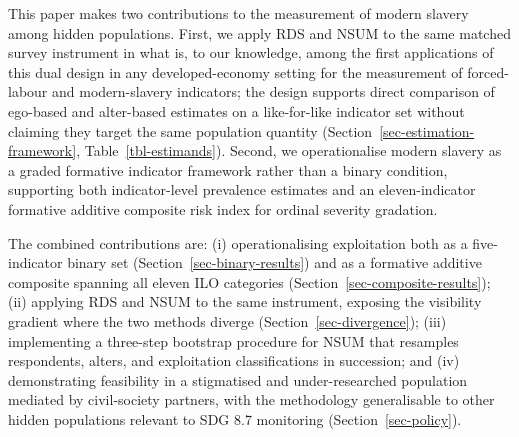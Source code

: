 \documentclass[
  12pt,
  letterpaper,
  DIV=11,
  numbers=noendperiod]{scrartcl}
\begin{document}
This paper makes two contributions to the measurement of modern slavery
among hidden populations. First, we apply RDS and NSUM to the same
matched survey instrument in what is, to our knowledge, among the first
applications of this dual design in any developed-economy setting for
the measurement of forced-labour and modern-slavery indicators; the
design supports direct comparison of ego-based and alter-based estimates
on a like-for-like indicator set without claiming they target the same
population quantity (Section~\ref{sec-estimation-framework},
Table~\ref{tbl-estimands}). Second, we operationalise modern slavery as
a graded formative indicator framework rather than a binary condition,
supporting both indicator-level prevalence estimates and an
eleven-indicator formative additive composite risk index for ordinal
severity gradation.

The combined contributions are: (i) operationalising exploitation both
as a five-indicator binary set (Section~\ref{sec-binary-results}) and as
a formative additive composite spanning all eleven ILO categories
(Section~\ref{sec-composite-results}); (ii) applying RDS and NSUM to the
same instrument, exposing the visibility gradient where the two methods
diverge (Section~\ref{sec-divergence}); (iii) implementing a three-step
bootstrap procedure for NSUM that resamples respondents, alters, and
exploitation classifications in succession; and (iv) demonstrating
feasibility in a stigmatised and under-researched population mediated by
civil-society partners, with the methodology generalisable to other
hidden populations relevant to SDG 8.7 monitoring
(Section~\ref{sec-policy}).
\end{document}
